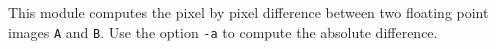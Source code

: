 This module computes the pixel by pixel difference between two floating
point images \verb+A+ and \verb+B+.
Use the option \verb+-a+ to compute the absolute difference.
